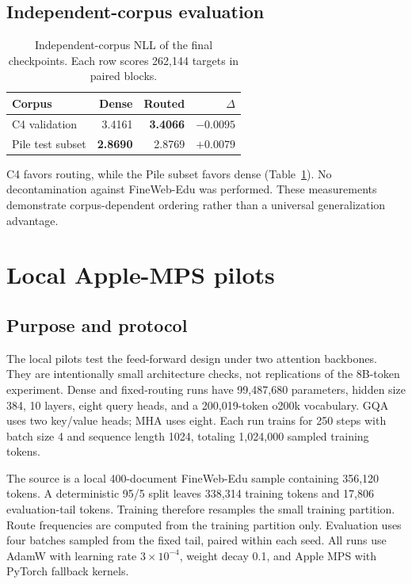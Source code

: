 \documentclass[10pt,twocolumn]{article}
\begin{document}
\subsection{Independent-corpus evaluation}

\begin{table}[t]
\centering
\small
\caption{Independent-corpus NLL of the final checkpoints. Each row scores
262,144 targets in paired blocks.}
\label{tab:heldout}
\begin{tabular}{lrrr}
\toprule
Corpus & Dense & Routed & $\Delta$ \\
\midrule
C4 validation & 3.4161 & \textbf{3.4066} & $-0.0095$ \\
Pile test subset & \textbf{2.8690} & 2.8769 & $+0.0079$ \\
\bottomrule
\end{tabular}
\end{table}

C4 favors routing, while the Pile subset favors dense
(Table~\ref{tab:heldout}). No decontamination against FineWeb-Edu was
performed. These measurements demonstrate corpus-dependent ordering rather
than a universal generalization advantage.

\section{Local Apple-MPS pilots}

\subsection{Purpose and protocol}

The local pilots test the feed-forward design under two attention backbones.
They are intentionally small architecture checks, not replications of the
8B-token experiment. Dense and fixed-routing runs have 99,487,680 parameters,
hidden size 384, 10 layers, eight query heads, and a 200,019-token o200k
vocabulary. GQA uses two key/value heads; MHA uses eight. Each run trains for
250 steps with batch size 4 and sequence length 1024, totaling 1,024,000
sampled training tokens.

The source is a local 400-document FineWeb-Edu sample containing 356,120
tokens. A deterministic 95/5 split leaves 338,314 training tokens and 17,806
evaluation-tail tokens. Training therefore resamples the small training
partition. Route frequencies are computed from the training partition only.
Evaluation uses four batches sampled from the fixed tail, paired within each
seed. All runs use AdamW with learning rate $3\times10^{-4}$, weight decay
0.1, and Apple MPS with PyTorch fallback kernels.
\end{document}
